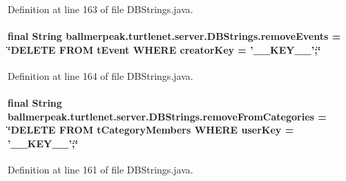 Definition at line 163 of file D\-B\-Strings.\-java.

\hypertarget{classballmerpeak_1_1turtlenet_1_1server_1_1DBStrings_a107f35f84bfad780727aa44465cf9c59}{
\paragraph[{remove\-Events}]{\setlength{\rightskip}{0pt plus 5cm}final String ballmerpeak.\-turtlenet.\-server.\-D\-B\-Strings.\-remove\-Events = \char`\"{}D\-E\-L\-E\-T\-E F\-R\-O\-M t\-Event W\-H\-E\-R\-E creator\-Key = '\-\_\-\-\_\-\-K\-E\-Y\-\_\-\-\_\-';\char`\"{}\hspace{0.3cm}{\ttfamily [static]}}}\label{classballmerpeak_1_1turtlenet_1_1server_1_1DBStrings_a107f35f84bfad780727aa44465cf9c59}


Definition at line 164 of file D\-B\-Strings.\-java.

\hypertarget{classballmerpeak_1_1turtlenet_1_1server_1_1DBStrings_a34489c428648e96854f7ae0665fa2830}{
\paragraph[{remove\-From\-Categories}]{\setlength{\rightskip}{0pt plus 5cm}final String ballmerpeak.\-turtlenet.\-server.\-D\-B\-Strings.\-remove\-From\-Categories = \char`\"{}D\-E\-L\-E\-T\-E F\-R\-O\-M t\-Category\-Members W\-H\-E\-R\-E user\-Key = '\-\_\-\-\_\-\-K\-E\-Y\-\_\-\-\_\-';\char`\"{}\hspace{0.3cm}{\ttfamily [static]}}}\label{classballmerpeak_1_1turtlenet_1_1server_1_1DBStrings_a34489c428648e96854f7ae0665fa2830}


Definition at line 161 of file D\-B\-Strings.\-java.

